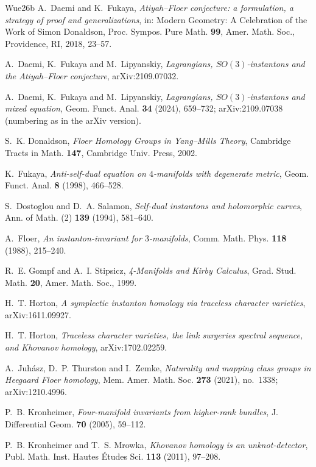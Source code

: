 \documentclass[11pt]{amsart}
\theoremstyle{definition}
\theoremstyle{remark}
\theoremstyle{plain}
\numberwithin{equation}{section}
\begin{document}
\begin{thebibliography}{Wue26b}
A.~Daemi and K.~Fukaya, \emph{Atiyah--Floer conjecture: a formulation, a
strategy of proof and generalizations}, in: Modern Geometry: A Celebration of
the Work of Simon Donaldson, Proc. Sympos. Pure Math. \textbf{99}, Amer. Math.
Soc., Providence, RI, 2018, 23--57.

A.~Daemi, K.~Fukaya and M.~Lipyanskiy, \emph{Lagrangians,
$SO(3)$-instantons and the Atiyah--Floer conjecture}, arXiv:2109.07032.

A.~Daemi, K.~Fukaya and M.~Lipyanskiy, \emph{Lagrangians,
$SO(3)$-instantons and mixed equation}, Geom. Funct. Anal. \textbf{34}
(2024), 659--732; arXiv:2109.07038 (numbering as in the arXiv version).

S.~K. Donaldson, \emph{Floer Homology Groups in Yang--Mills Theory},
Cambridge Tracts in Math. \textbf{147}, Cambridge Univ. Press, 2002.

K.~Fukaya, \emph{Anti-self-dual equation on $4$-manifolds with degenerate metric},
Geom. Funct. Anal. \textbf{8} (1998), 466--528.

S.~Dostoglou and D.~A. Salamon, \emph{Self-dual instantons and
holomorphic curves}, Ann. of Math. (2) \textbf{139} (1994), 581--640.

A.~Floer, \emph{An instanton-invariant for $3$-manifolds}, Comm. Math. Phys.
\textbf{118} (1988), 215--240.

R.~E. Gompf and A.~I. Stipsicz, \emph{4-Manifolds and Kirby Calculus},
Grad. Stud. Math. \textbf{20}, Amer. Math. Soc., 1999.

H.~T. Horton, \emph{A symplectic instanton homology via traceless character
varieties}, arXiv:1611.09927.

H.~T. Horton, \emph{Traceless character varieties, the link surgeries spectral
sequence, and Khovanov homology}, arXiv:1702.02259.

A.~Juh\'asz, D.~P. Thurston and I.~Zemke, \emph{Naturality and mapping
class groups in Heegaard Floer homology}, Mem. Amer. Math. Soc.
\textbf{273} (2021), no.~1338; arXiv:1210.4996.

P.~B. Kronheimer, \emph{Four-manifold invariants from higher-rank
bundles}, J. Differential Geom. \textbf{70} (2005), 59--112.

P.~B. Kronheimer and T.~S. Mrowka, \emph{Khovanov homology is an
unknot-detector}, Publ. Math. Inst. Hautes \'Etudes Sci. \textbf{113}
(2011), 97--208.


\end{thebibliography}
\end{document}
